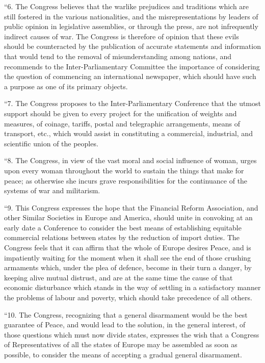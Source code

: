 \documentclass{book}
\begin{document}
“6. The Congress believes that the warlike prejudices and traditions which are still fostered in the various nationalities, and the misrepresentations by leaders of public opinion in legislative assemblies, or through the press, are not infrequently indirect causes of war. The Congress is therefore of opinion that these evils should be counteracted by the publication of accurate statements and information that would tend to the removal of misunderstanding among nations, and recommends to the Inter-Parliamentary Committee the importance of considering the question of commencing an international newspaper, which should have such a purpose as one of its primary objects.

“7. The Congress proposes to the Inter-Parliamentary Conference that the utmost support should be given to every project for the unification of weights and measures, of coinage, tariffs, postal and telegraphic arrangements, means of transport, etc., which would assist in constituting a commercial, industrial, and scientific union of the peoples.

“8. The Congress, in view of the vast moral and social influence of woman, urges upon every woman throughout the world to sustain the things that make for peace; as otherwise she incurs grave responsibilities for the continuance of the systems of war and militarism.

“9. This Congress expresses the hope that the Financial Reform Association, and other Similar Societies in Europe and America, should unite in convoking at an early date a Conference to consider the best means of establishing equitable commercial relations between states by the reduction of import duties. The Congress feels that it can affirm that the whole of Europe desires Peace, and is impatiently waiting for the moment when it shall see the end of those crushing armaments which, under the plea of defence, become in their turn a danger, by keeping alive mutual distrust, and are at the same time the cause of that economic disturbance which stands in the way of settling in a satisfactory manner the problems of labour and poverty, which should take precedence of all others.

“10. The Congress, recognizing that a general disarmament would be the best guarantee of Peace, and would lead to the solution, in the general interest, of those questions which must now divide states, expresses the wish that a Congress of Representatives of all the states of Europe may be assembled as soon as possible, to consider the means of accepting a gradual general disarmament.
\end{document}
